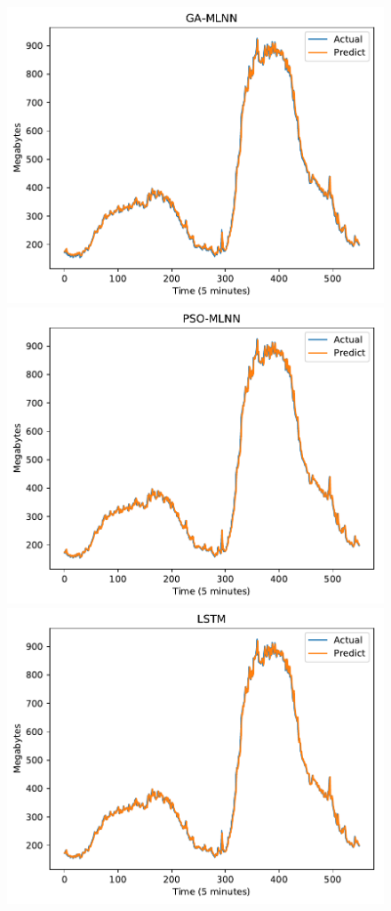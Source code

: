 \documentclass[11pt,twoside]{article}
\begin{document}
\begin{multicols}{2}
\begin{figure}[!ht] 
  \begin{minipage}[b]{0.33\linewidth}
    \centering
    \includegraphics[width=0.9\linewidth]{predict/k2/eu_k2_ga_mlnn.pdf} 
  \end{minipage}
  \begin{minipage}[b]{0.33\linewidth}
    \centering
    \includegraphics[width=0.9\linewidth]{predict/k2/eu_k2_pso_mlnn.pdf} 
  \end{minipage} 
  \begin{minipage}[b]{0.33\linewidth}
    \centering
    \includegraphics[width=0.9\linewidth]{predict/k2/eu_k2_lstm.pdf} 

\end{minipage}
\end{figure}
\end{multicols}
\end{document}
